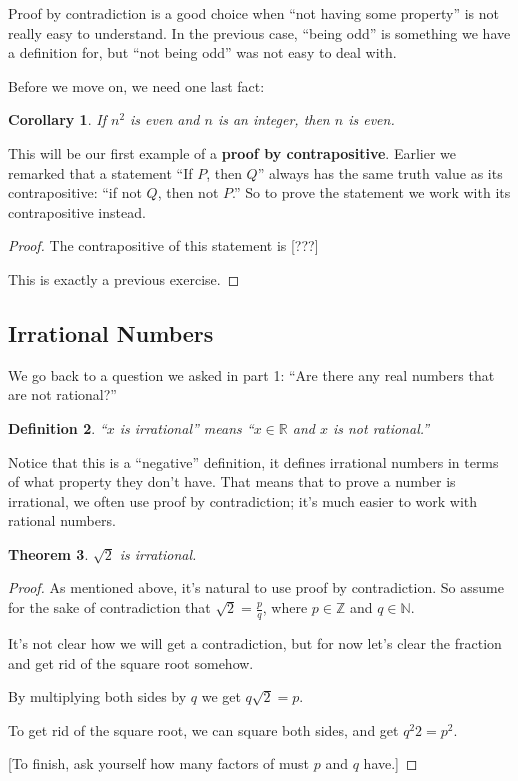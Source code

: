 \documentclass[11pt]{article}
\newtheorem{thm}{Theorem}
\newtheorem{dfn}[thm]{Definition}
\newtheorem{cor}[thm]{Corollary}
\theoremstyle{definition}
\numberwithin{thm}{section}
\begin{document}
Proof by contradiction is a good choice when ``not having some property'' is not really easy to understand. In the previous case, ``being odd'' is something we have a definition for, but ``not being odd'' was not easy to deal with.

Before we move on, we need one last fact:

\begin{cor} If $n^2$ is even and $n$ is an integer, then $n$ is even.
\end{cor}

 This will be our first example of a \textbf{proof by contrapositive}. Earlier we remarked that a statement ``If $P$, then $Q$'' always has the same truth value as its contrapositive: ``if not $Q$, then not $P$.'' So to prove the statement we work with its contrapositive instead.

\begin{proof} The contrapositive of this statement is [???]

This is exactly a previous exercise.
\end{proof}

\subsection{Irrational Numbers}

We go back to a question we asked in part 1: ``Are there any real numbers that are not rational?''

\begin{dfn} ``$x$ is irrational'' means ``$x \in \mathbb{R}$ and $x$ is not rational.''
\end{dfn}

Notice that this is a ``negative'' definition, it defines irrational numbers in terms of what property they don't have. That means that to prove a number is irrational, we often use proof by contradiction; it's much easier to work with rational numbers.

\begin{thm} $\sqrt{2}$ is irrational.
\end{thm}

\begin{proof} As mentioned above, it's natural to use proof by contradiction. So assume for the sake of contradiction that $\sqrt{2} = \frac{p}{q}$, where 
$p \in \mathbb{Z}$ and $q \in \mathbb{N}$.

It's not clear how we will get a contradiction, but for now let's clear the fraction and get rid of the square root somehow.

By multiplying both sides by $q$ we get $q \sqrt{2} = p$.

To get rid of the square root, we can square both sides, and get $q^2 2 = p^2$.

[To finish, ask yourself how many factors of must $p$ and $q$ have.]
\end{proof}
\end{document}
